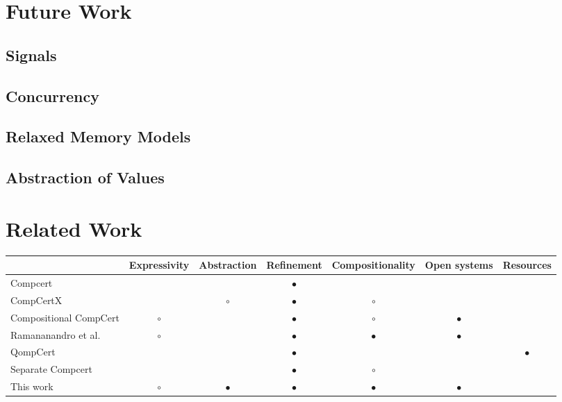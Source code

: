 \documentclass[sigplan,10pt,review,anonymous]{acmart}
\begin{document}

\section{Future Work} %

\subsection{Signals}
\subsection{Concurrency}
\subsection{Relaxed Memory Models}
\subsection{Abstraction of Values} %


\section{Related Work} %

\begin{table}
  \begin{tabular}{lcccccc}
    \hline
    & Expressivity & Abstraction & Refinement & Compositionality & Open systems & Resources \\
    \hline
    Compcert \cite{compcert}
      &           &           & $\bullet$ &           &           & \\
    CompCertX \cite{popl2015}
      &           & $\circ$   & $\bullet$ & $\circ$   &           & \\
    Compositional CompCert \cite{compcompcert}
      & $\circ$   &           & $\bullet$ & $\circ$   & $\bullet$ & \\
    Ramananandro et al. \cite{cpp2015}
      & $\circ$   &           & $\bullet$ & $\bullet$ & $\bullet$ & \\
    QompCert \cite{qompcert}
      &           &           & $\bullet$ &           &           & $\bullet$ \\
    Separate Compcert \cite{lwsc}
      &           &           & $\bullet$ & $\circ$   &           & \\
    This work
      & $\circ$   & $\bullet$ & $\bullet$ & $\bullet$ & $\bullet$ & \\
    \hline
  \end{tabular}
\end{table}
\end{document}
